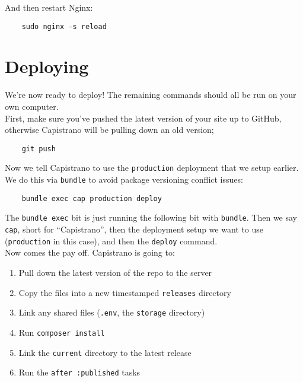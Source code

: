 And then restart Nginx:

\begin{verbatim}
    sudo nginx -s reload
\end{verbatim}



\section{Deploying}

We're now ready to deploy! The remaining commands should all be run on your own computer.
\\

First, make sure you've pushed the latest version of your site up to GitHub, otherwise Capistrano will be pulling down an old version;

\begin{verbatim}
    git push
\end{verbatim}

Now we tell Capistrano to use the \texttt{production} deployment that we setup earlier. We do this via \texttt{bundle} to avoid package versioning conflict issues:

\begin{verbatim}
    bundle exec cap production deploy
\end{verbatim}

The \texttt{bundle exec} bit is just running the following bit with \texttt{bundle}. Then we say \texttt{cap}, short for ``Capistrano'', then the deployment setup we want to use (\texttt{production} in this case), and then the \texttt{deploy} command.
\\

Now comes the pay off. Capistrano is going to:

\begin{enumerate}
    \item Pull down the latest version of the repo to the server
    \item Copy the files into a new timestamped \texttt{releases} directory
    \item Link any shared files (\texttt{.env}, the \texttt{storage} directory)
    \item Run \texttt{composer install}
    \item Link the \texttt{current} directory to the latest release
    \item Run the \texttt{after :published} tasks
\end{enumerate}

